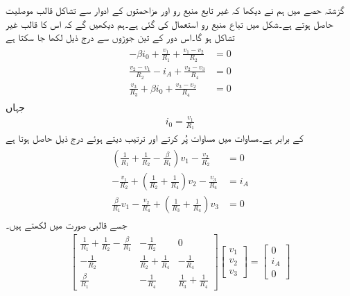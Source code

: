 گزشتہ حصے میں ہم نے دیکھا کہ غیر تابع منبع رو اور مزاحمتوں کے ادوار سے تشاکل قالب موصلیت حاصل ہوتے ہے۔شکل  میں تباع منبع رو استعمال کی گئی ہے۔ہم دیکھیں گے کہ اس کا  قالب غیر تشاکل ہو گا۔اس دور کے تین جوڑوں سے درج ذیل لکھا جا سکتا ہے
\begin{gather}
\begin{aligned}\label{مساوات_جوڑ_تابع_منبع_رو_غیر_تشاکل_قالب_الف}
-\beta i_0+\frac{v_1}{R_1}+\frac{v_1-v_2}{R_2}&=0\\
\frac{v_2-v_1}{R_2}-i_A+\frac{v_2-v_3}{R_4}&=0\\
\frac{v_3}{R_3}+\beta i_0+\frac{v_3-v_2}{R_4}&=0
\end{aligned}
\end{gather}
جہاں
\begin{align}\label{مساوات_جوڑ_تابع_منبع_رو_غیر_تشاکل_قالب_ب}
i_0=\frac{v_1}{R_1}
\end{align}
کے برابر ہے۔مساوات  میں مساوات  پُر کرتے اور ترتیب دیتے ہوئے درج ذیل حاصل ہوتا ہے
\begin{gather}
\begin{aligned}\label{مساوات_جوڑ_تابع_منبع_رو_غیر_تشاکل_قالب_پ}
\left(\frac{1}{R_1}+\frac{1}{R_2}-\frac{\beta}{R_1}\right) v_1-\frac{v_2}{R_2}&=0\\
-\frac{v_1}{R_2}+\left(\frac{1}{R_2}+\frac{1}{R_4}\right)v_2-\frac{v_3}{R_4}&=i_A\\
\frac{\beta}{R_1} v_1 -\frac{v_2}{R_4}+\left(\frac{1}{R_3}+\frac{1}{R_4}\right)v_3&=0
\end{aligned}
\end{gather}
جسے قالبی صورت میں لکھتے ہیں۔
\begin{align}\label{مساوات_جوڑ_تابع_منبع_مثال_الف}
\begin{bmatrix}
\frac{1}{R_1}+\frac{1}{R_2}-\frac{\beta}{R_1}&-\frac{1}{R_2}&0\\
-\frac{1}{R_2}&\frac{1}{R_2}+\frac{1}{R_4}&-\frac{1}{R_4}\\
\frac{\beta}{R_1}& -\frac{1}{R_4}&\frac{1}{R_3}+\frac{1}{R_4}
\end{bmatrix}
\begin{bmatrix}
v_1\\
v_2\\
v_3
\end{bmatrix}
=
\begin{bmatrix}
0\\
i_A\\
0
\end{bmatrix}
\end{align}
